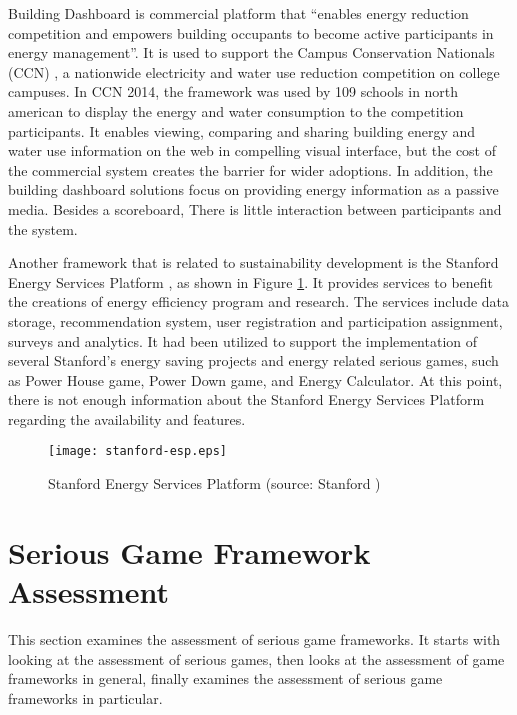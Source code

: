Building Dashboard is commercial platform that ``enables energy reduction competition and empowers building occupants to become active participants in energy management''. It is used to support the Campus Conservation Nationals (CCN) \cite{competetoreduce}, a nationwide electricity and water use reduction competition on college campuses. In CCN 2014, the framework was used by 109 schools in north american to display the energy and water consumption to the competition participants. It enables viewing, comparing and sharing building energy
and water use information on the web in compelling visual interface, but the
cost of the commercial system creates the barrier for wider adoptions. In addition, the
building dashboard solutions focus on providing energy information as
a passive media. Besides a scoreboard, There is little interaction between participants
and the system.

Another framework that is related to sustainability development is the Stanford Energy Services Platform \cite{Armel-2012}, as shown in Figure \ref{fig:stanford-platform}. It provides services to benefit the creations of energy efficiency program and research. The services include data storage, recommendation system, user registration and participation assignment, surveys and analytics. It had been utilized to support
the implementation of several Stanford's energy saving projects and energy related serious games, such as Power House game, Power Down game, and Energy Calculator. At this point, there is not enough information about the Stanford Energy Services Platform regarding the availability and features. 

\begin{figure}[htbp]
	\centering
		\texttt{[image: stanford-esp.eps]}
		\caption{Stanford Energy Services Platform (source: Stanford \cite{Armel-2012})}
		\label{fig:stanford-platform}
\end{figure}
 
\section{Serious Game Framework Assessment}
\label{Serious-Game-Framework-Assessment}

This section examines the assessment of serious game frameworks. It starts with looking at the assessment of serious games, then looks at the assessment of game frameworks in general, finally examines the assessment of serious game frameworks in particular.

